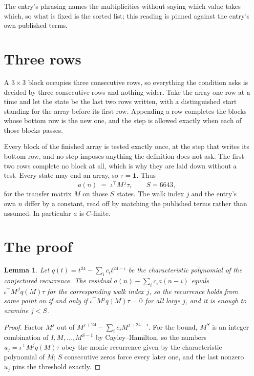 \documentclass[11pt,a4paper]{article}
\theoremstyle{plain}
\newtheorem{lemma}[theorem]{Lemma}
\theoremstyle{definition}
\begin{document}
The entry's phrasing names the multiplicities without saying which value takes which, so what is fixed is the sorted list; this reading is pinned against the entry's own published terms.

\section{Three rows}

A $3\times3$ block occupies three consecutive rows, so everything the condition asks is decided
by three consecutive rows and nothing wider. Take the array one row at a time and let the state
be the last two rows written, with a distinguished start standing for the array before its
first row. Appending a row completes the blocks whose bottom row is the new one, and the step
is allowed exactly when each of those blocks passes.

Every block of the finished array is tested exactly once, at the step that writes its bottom
row, and no step imposes anything the definition does not ask. The first two rows complete no
block at all, which is why they are laid down without a test. Every state may end an array, so
$\tau=\mathbf{1}$. Thus
\[
a(n)\;=\;\iota^{\!\top}M^{\,j}\tau ,\qquad S=6643,
\]
for the transfer matrix $M$ on those $S$ states. The walk index $j$ and the entry's own $n$
differ by a constant, read off by matching the published terms rather than assumed. In
particular $a$ is $C$-finite.

\section{The proof}

\begin{lemma}\label{lem:crit}
Let $q(t)=t^{24}-\sum_i c_it^{24-i}$ be the characteristic polynomial of the
conjectured recurrence. The residual $a(n)-\sum_ic_ia(n-i)$ equals
$\iota^{\!\top}M^{\,j}q(M)\tau$ for the corresponding walk index $j$, so the recurrence
holds from some point on if and only if $\iota^{\!\top}M^{j}q(M)\tau=0$ for all large $j$,
and it is enough to examine $j<S$.
\end{lemma}

\begin{proof}
Factor $M^{j}$ out of $M^{j+24}-\sum_ic_iM^{j+24-i}$. For the bound, $M^{S}$
is an integer combination of $I,M,\dots,M^{S-1}$ by Cayley--Hamilton, so the numbers
$u_j=\iota^{\!\top}M^{j}q(M)\tau$ obey the monic recurrence given by the characteristic
polynomial of $M$; $S$ consecutive zeros force every later one, and the last nonzero $u_j$
pins the threshold exactly.
\end{proof}
\end{document}
